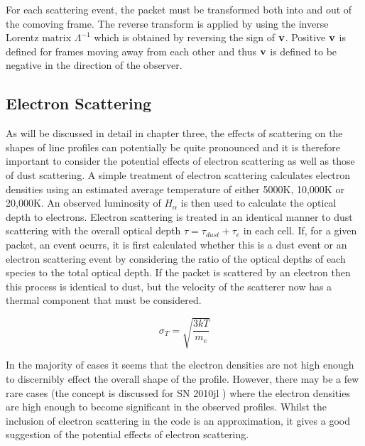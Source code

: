 For each scattering event, the packet must be transformed both into and out of the comoving frame. The reverse transform is applied by using the inverse Lorentz matrix $\Lambda^{-1}$ which is obtained by reversing the sign of $\bf{v}$.  Positive $\bf{v}$ is defined for frames moving away from each other and thus $\bf{v}$ is defined to be negative in the direction of the observer.
	

	\subsection{Electron Scattering}
	\label{scn:ES}
	As will be discussed in detail in chapter three, the effects of scattering on the shapes of line profiles can potentially be quite pronounced and it is therefore important to consider the potential effects of electron scattering as well as those of dust scattering.  A simple treatment of electron scattering calculates electron densities using an estimated average temperature of either 5000K, 10,000K or 20,000K.  An observed luminosity of $H_{\alpha}$ is then used to calculate the optical depth to electrons.  Electron scattering is treated in an identical manner to dust scattering with the overall optical depth $\tau = \tau_{dust}+\tau_{e}$ in each cell.  If, for a given packet, an event ocurrs, it is first calculated whether this is a dust event or an electron scattering event by considering the ratio of the optical depths of each species to the total optical depth.  If the packet is scattered by an electron then this process is identical to dust, but the velocity of the scatterer now has a thermal component that must be considered.  
	
	
			\begin{equation}
		\label{eqn:sigma_maxwell}
		\sigma_T=\sqrt{\frac{3kT}{m_e}}
		\end{equation}

In the majority of cases it seems that the electron densities are not high enough to discernibly effect the overall shape of the profile.  However, there may be a few rare cases (the concept is discussed for SN 2010jl \citep{Fransson2013}) where the electron densities are high enough to become significant in the observed profiles.  Whilst the inclusion of electron scattering in the code is an approximation, it gives a good suggestion of the potential effects of electron scattering.	
	
